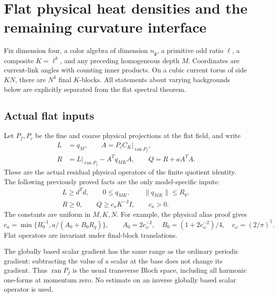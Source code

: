 \section{Flat physical heat densities and the remaining curvature interface}
\label{pvs-section}

Fix dimension four, a color algebra of dimension \(n_{\mathfrak g}\),
a primitive odd ratio \(\ell\), a composite \(K=\ell^k\), and any
preceding homogeneous depth \(M\).
Coordinates are current-link angles with counting inner products.
On a cubic current torus of side \(KN\), there are \(N^4\) final
\(K\)-blocks.
All statements about varying backgrounds below are explicitly
separated from the flat spectral theorem.

\subsection{Actual flat inputs}
\label{pvs-input-section}

Let \(P_f,P_c\) be the fine and coarse physical projections at
the flat field, and write
\begin{equation}
 \begin{split}
 L&=q_M,\qquad A=P_cC_K|_{\operatorname{ran}P_f},\\
 R&=L|_{\operatorname{ran}P_f}-A^Tq_{MK}A,\qquad
 Q=R+aA^TA .
 \end{split}
 \label{pvs-operators}
\end{equation}
These are the actual residual physical operators of the finite
quotient identity. The following previously proved facts are the
only model-specific inputs:
\begin{equation}
 \begin{gathered}
 L\ge d^Td,\qquad 0\le q_{MK},\qquad \|q_{MK}\|\le R_q,\\
 R\ge0,\qquad Q\ge c_aK^{-2}I,\qquad c_a>0 .
 \end{gathered}
 \label{pvs-inputs}
\end{equation}
The constants are uniform in \(M,K,N\).
For example, the physical alias proof gives
\[
 c_a=\min\{B_0^{-1},a/(A_0+B_0R_q)\},\qquad
 A_0=2c_\omega^{-2},\quad
 B_0=(1+2c_\omega^{-2})/4,\quad c_\omega=(2/\pi)^5.
\]
Flat operators are invariant under final-block translations.

The globally based scalar gradient has the same range as the
ordinary periodic gradient: subtracting the value of a scalar at
the base does not change its gradient.
Thus \(\operatorname{ran}P_f\) is the usual transverse Bloch
space, including all harmonic one-forms at momentum zero.
No estimate on an inverse globally based scalar operator is used.

